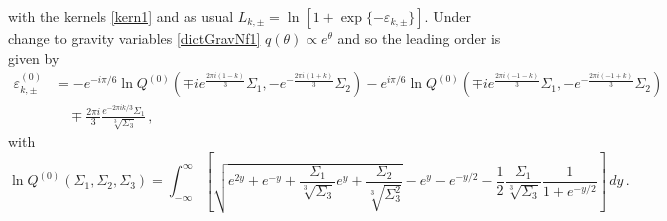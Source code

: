 \documentclass[11pt,a4paper]{elsarticle}
\def \th {\theta}
\def \ba {\begin{aligned}}
\def \ea {\end{aligned}}
\newcommand{\be}{\begin{equation}}
\newcommand{\ee}{\end{equation}}
\def\th{\theta}
\numberwithin{figure}{section}
\numberwithin{table}{section}
\begin{document}
with the kernels \eqref{kern1} and as usual $L_{k,\pm} = \ln [1+ \exp \{-\varepsilon_{k,\pm} \}]$. 
Under change to gravity variables \eqref{dictGravNf1} $q(\th ) \propto e^{\th }$ and so the leading order is given by
\small
\be 
\ba
\varepsilon^{(0)}_{k,\pm} &= - e^{-i \pi/6} \ln Q^{(0)}(\mp i e^{\frac{2\pi i(1-k)}{3}} \Sigma_1,-e^{-\frac{2 \pi i(1+k)}{3}}\Sigma_2) - e^{i \pi/6} \ln Q^{(0)}(\mp i e^{\frac{2\pi i(-1-k)}{3}} \Sigma_1,-e^{-\frac{2 \pi i(-1+k)}{3}}\Sigma_2)\\
&\quad \mp \frac{2 \pi i}{3}\frac{ e^{-2 \pi i k/3}\Sigma_1}{\sqrt[3]{\Sigma_3}}\,,
\ea
\ee 
with
\normalsize
\be \label{c0TBAgrav1}
\ln Q^{(0)}( \Sigma_1, \Sigma_2,\Sigma_3) = \int_{-\infty}^\infty \left[\sqrt{e^{2y}+ e^{-y} + \frac{\Sigma_1}{\sqrt[3]{\Sigma_3}}e^y+\frac{\Sigma_2}{\sqrt[3]{\Sigma_3^2}}} -e^y -e^{-y/2} -\frac{1}{2} \frac{\Sigma_1}{\sqrt[3]{\Sigma_3}} \frac{1}{1+e^{-y/2}}\right]\, dy \,.
\ee 
\end{document}
